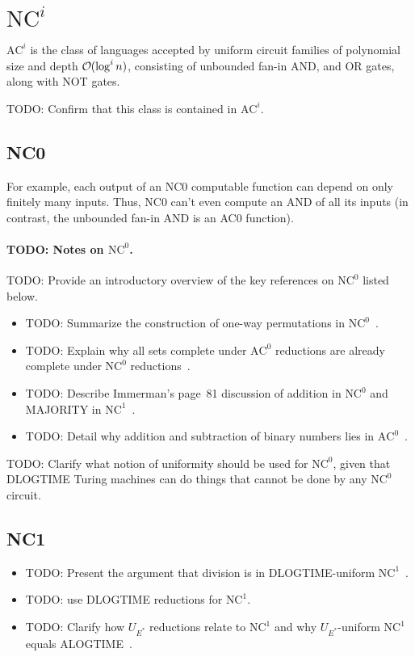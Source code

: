 \section{\texorpdfstring{$\text{NC}^i$}{NC\string^i}}
$\text{AC}^i$ is the class of languages accepted by uniform circuit
families of polynomial size and depth $\bigO(\log^i n)$, consisting of unbounded fan-in
AND, and OR gates, along with NOT gates.

TODO: Confirm that this class is contained in $\text{AC}^i$.

\subsection{NC0}
For example, each output of an NC0 computable function can depend on only finitely many
inputs. Thus, NC0 can't even compute an AND of all its inputs (in contrast, the unbounded
fan-in AND is an AC0 function).
\paragraph{TODO: Notes on $\text{NC}^0$.}
TODO: Provide an introductory overview of the key references on $\text{NC}^0$ listed below.
\begin{itemize}
\item TODO: Summarize the construction of one-way permutations in $\text{NC}^0$~\cite{10.1016/0020-01908790053-6}.
\item TODO: Explain why all sets complete under $\text{AC}^0$ reductions are already complete under $\text{NC}^0$ reductions~\cite{10.1145/258533.258671,AGRAWAL1998127}.
\item TODO: Describe Immerman's page~81 discussion of addition in $\text{NC}^0$ and MAJORITY in $\text{NC}^1$~\cite{Immerman1999-IMMDC}.
\item TODO: Detail why addition and subtraction of binary numbers lies in $\text{AC}^0$~\cite{27676}.
\end{itemize}


TODO: Clarify what notion of uniformity should be used for $\text{NC}^0$, given that DLOGTIME Turing machines can do things that cannot be done by
any $\text{NC}^0$ circuit.
\subsection{NC1}
\begin{itemize}
\item TODO: Present the argument that division is in DLOGTIME-uniform $\text{NC}^1$~\cite{ITA_2001__35_3_259_0}.
\item TODO: use DLOGTIME reductions for $\text{NC}^1$.
\item TODO: Clarify how $U_{E^*}$ reductions relate to $\text{NC}^1$ and why $U_{E^*}$-uniform $\text{NC}^1$ equals ALOGTIME~\cite{RUZZO1981365}.
\end{itemize}


